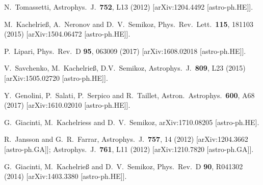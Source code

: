 \documentclass[prd,aps,twocolumn]{revtex4}
\begin{document}
\begin{thebibliography}{99}
N.~Tomassetti,
  Astrophys.\ J.\  {\bf 752}, L13 (2012)
  [arXiv:1204.4492 [astro-ph.HE]].



  M.~Kachelrie{\ss}, A.~Neronov and D.~V.~Semikoz,
  Phys.\ Rev.\ Lett.\  {\bf 115}, 181103 (2015)
  [arXiv:1504.06472 [astro-ph.HE]].


  P.~Lipari,
  Phys.\ Rev.\ D {\bf 95}, 063009 (2017)
  [arXiv:1608.02018 [astro-ph.HE]].

V.~Savchenko, M.~Kachelrie\ss, D.V.~Semikoz, 
Astrophys.\ J.\  {\bf 809}, L23 (2015)
[arXiv:1505.02720 [astro-ph.HE]].


Y.~Genolini, P.~Salati, P.~Serpico and R.~Taillet,
  Astron.\ Astrophys.\  {\bf 600}, A68 (2017)
  [arXiv:1610.02010 [astro-ph.HE]].


G.~Giacinti, M.~Kachelriess and D.~V.~Semikoz,
  arXiv:1710.08205 [astro-ph.HE].

  
  R.~Jansson and G.~R.~Farrar,
  Astrophys.\ J.\  {\bf 757}, 14 (2012)
  [arXiv:1204.3662 [astro-ph.GA]];
  Astrophys.\ J.\  {\bf 761}, L11 (2012)
  [arXiv:1210.7820 [astro-ph.GA]].

  
  G.~Giacinti, M.~Kachelrie{\ss} and D.~V.~Semikoz,
  Phys.\ Rev.\ D {\bf 90}, R041302 (2014)
  [arXiv:1403.3380 [astro-ph.HE]].


\end{thebibliography}
\end{document}
